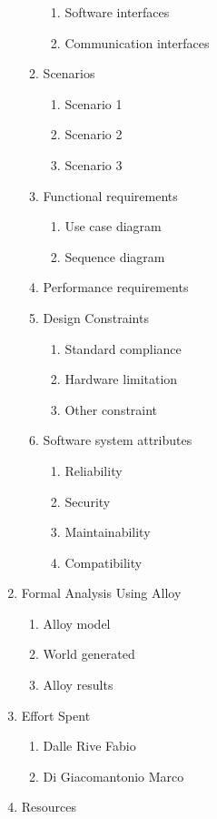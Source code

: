 \documentclass{article}
\begin{document}
\begin{enumerate}
\begin{enumerate}
\begin{enumerate}
					\item Software interfaces
					\item Communication interfaces
				\end{enumerate}
				\item Scenarios
				\begin{enumerate}
					\item Scenario 1
					\item Scenario 2
					\item Scenario 3
				\end{enumerate}
				\item Functional requirements
				\begin{enumerate}
					\item Use case diagram
					\item Sequence diagram
				\end{enumerate}
				\item Performance requirements
				\item Design Constraints
				\begin{enumerate}
					\item Standard compliance
					\item Hardware limitation
					\item Other constraint
				\end{enumerate}
				\item Software system attributes
				\begin{enumerate}
					\item Reliability
					\item Security
					\item Maintainability
					\item Compatibility
				\end{enumerate}
			\end{enumerate}
			\item Formal Analysis Using Alloy
			\begin{enumerate}
				\item Alloy model
				\item World generated
				\item Alloy results
			\end{enumerate}
			\item Effort Spent
			\begin{enumerate}
			\item Dalle Rive Fabio
			\item Di Giacomantonio Marco
			\end{enumerate}
			\item Resources
	\end{enumerate}
	\newpage
\end{document}
